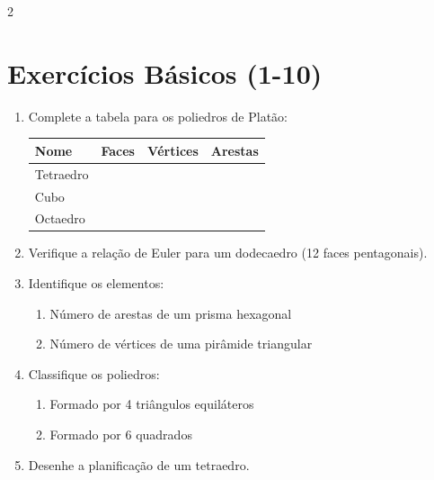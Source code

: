 \documentclass[11pt]{article}
\begin{document}
\begin{multicols}{2}
\section*{Exercícios Básicos (1-10)}
\begin{enumerate}
    \item Complete a tabela para os poliedros de Platão:
    \begin{center}
    \begin{tabular}{|l|c|c|c|}
    \hline
    Nome & Faces & Vértices & Arestas \\
    \hline
    Tetraedro & \hspace{1cm} & \hspace{1cm} & \hspace{1cm} \\
    Cubo & \hspace{1cm} & \hspace{1cm} & \hspace{1cm} \\
    Octaedro & \hspace{1cm} & \hspace{1cm} & \hspace{1cm} \\
    \hline
    \end{tabular}
    \end{center}
    
    \item Verifique a relação de Euler para um dodecaedro (12 faces pentagonais).
    
    \item Identifique os elementos:
    \begin{enumerate}[label=\alph*)]
        \item Número de arestas de um prisma hexagonal
        \item Número de vértices de uma pirâmide triangular
    \end{enumerate}
    
    \item Classifique os poliedros:
    \begin{enumerate}[label=\alph*)]
        \item Formado por 4 triângulos equiláteros
        \item Formado por 6 quadrados
    \end{enumerate}
    
    \item Desenhe a planificação de um tetraedro.
\end{enumerate}


\end{multicols}
\end{document}
